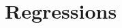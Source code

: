 \documentclass[11pt]{article}
\numberwithin{table}{section}   %
\begin{document}
\section{Regressions} \label{sec:regressions}






\clearpage



%
  
\end{document}
